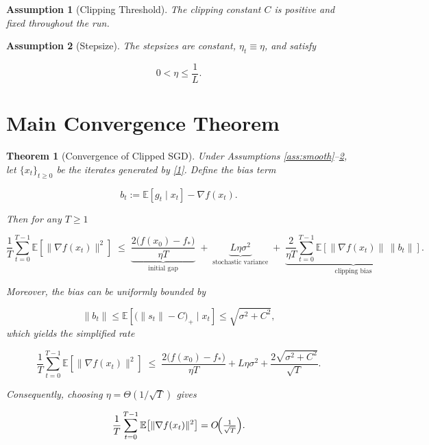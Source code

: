 \documentclass{article}
\newtheorem{theorem}{Theorem}
\newtheorem{assumption}{Assumption}
\newcommand{\E}{\mathbb{E}}
\begin{document}
\begin{assumption}[Clipping Threshold]\label{ass:C}
The clipping constant $C$ is positive and fixed throughout the run.
\end{assumption}

\begin{assumption}[Stepsize]\label{ass:stepsize}
The stepsizes are constant, $\eta_{t}\equiv\eta$, and satisfy  

\[
0<\eta\le \frac{1}{L}.
\]
\end{assumption}

\section*{Main Convergence Theorem}
\begin{theorem}[Convergence of Clipped SGD]\label{thm:main}
Under Assumptions \ref{ass:smooth}–\ref{ass:stepsize}, let $\{x_{t}\}_{t\ge0}$
be the iterates generated by \eqref{1}. Define the bias term  

\[
b_{t}:=\E\!\left[g_{t}\mid x_{t}\right]-\nabla f(x_{t}).
\]

Then for any $T\ge1$  

\[
\frac{1}{T}\sum_{t=0}^{T-1}\E\!\left[\|\nabla f(x_{t})\|^{2}\right]
\;\le\;
\underbrace{\frac{2\bigl(f(x_{0})-f_{*}\bigr)}{\eta T}}_{\text{initial gap}}
\;+\;
\underbrace{L\eta\sigma^{2}}_{\text{stochastic variance}}
\;+\;
\underbrace{\frac{2}{\eta T}\sum_{t=0}^{T-1}\E\!\left[\|\nabla f(x_{t})\|\,
\|b_{t}\|\right]}_{\text{clipping bias}} .
\tag{2}
\]

Moreover, the bias can be uniformly bounded by  

\[
\|b_{t}\|\le \E\!\left[\bigl(\|s_{t}\|-C\bigr)_{+}\mid x_{t}\right]
\le \sqrt{\sigma^{2}+C^{2}},
\]
which yields the simplified rate  

\[
\frac{1}{T}\sum_{t=0}^{T-1}\E\!\left[\|\nabla f(x_{t})\|^{2}\right]
\;\le\;
\frac{2\bigl(f(x_{0})-f_{*}\bigr)}{\eta T}+L\eta\sigma^{2}
+\frac{2\sqrt{\sigma^{2}+C^{2}}}{\sqrt{T}} .
\tag{3}
\]

Consequently, choosing $\eta=\Theta(1/\sqrt{T})$ gives  

\[
\frac{1}{T}\sum_{t=0}^{T-1}\E\!\left[\|\nabla f(x_{t})\|^{2}\right]
=O\!\Bigl(\tfrac{1}{\sqrt{T}}\Bigr).
\]
\end{theorem}

\end{document}
